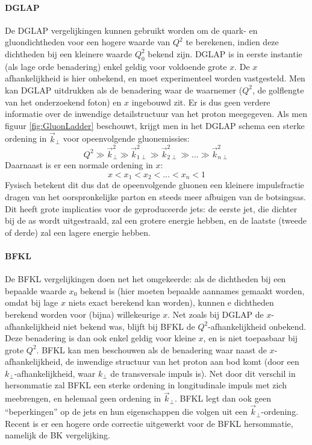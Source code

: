 \documentclass[a4paper,11pt]{article}
\numberwithin{equation}{section} %
\begin{document}
      \paragraph{DGLAP} \label{sec:DGLAP}
De DGLAP vergelijkingen kunnen gebruikt worden om de quark- en gluondichtheden voor een hogere waarde van $Q^2$ te berekenen, indien deze dichtheden bij een kleinere waarde $Q_0^2$ bekend zijn.
DGLAP is in eerste instantie (als lage orde benadering) enkel geldig voor voldoende grote $x$.
De $x$ afhankelijkheid is hier onbekend, en moet experimenteel worden vastgesteld.
Men kan DGLAP uitdrukken als de benadering waar de waarnemer ($Q^2$, de golflengte van het onderzoekend foton) en $x$ ingebouwd zit.
Er is dus geen verdere informatie over de inwendige detailstructuur van het proton meegegeven.
Als men figuur \ref{fig:GluonLadder} beschouwt, krijgt men in het DGLAP schema een sterke ordening in $\vec{k}_\perp$ voor opeenvolgende gluonemissies:
\begin{equation}
Q^2 \gg \vec{k}_\perp^2 \gg \vec{k}_{1\perp}^2 \gg \vec{k}_{2\perp}^2 \gg \hdots \gg \vec{k}_{n\perp}^2
\end{equation}
Daarnaast is er een normale ordening in $x$:
\begin{equation}
x < x_1 < x_2 < \hdots < x_n < 1
\end{equation}
Fysisch betekent dit dus dat de opeenvolgende gluonen een kleinere impulsfractie dragen van het oorspronkelijke parton en steeds meer afbuigen van de botsingsas.
Dit heeft grote implicaties voor de geproduceerde jets: de eerste jet, die dichter bij de as wordt uitgestraald, zal een grotere energie hebben, en de laatste (tweede of derde) zal een lagere energie hebben.

      \paragraph{BFKL}
De BFKL vergelijkingen doen net het omgekeerde: als de dichtheden bij een bepaalde waarde $x_0$ bekend is (hier moeten bepaalde aannames gemaakt worden, omdat bij lage $x$ niets exact berekend kan worden), kunnen e dichtheden berekend worden voor (bijna) willekeurige $x$.
Net zoals bij DGLAP de $x$-afhankelijkheid niet bekend was, blijft bij BFKL de $Q^2$-afhankelijkheid onbekend.
Deze benadering is dan ook enkel geldig voor kleine $x$, en is niet toepasbaar bij grote $Q^2$.
BFKL kan men beschouwen als de benadering waar naast de $x$-afhankelijkheid, de inwendige structuur van het proton aan bod komt (door een $k_\perp$-afhankelijkheid, waar $k_\perp$ de transversale impuls is).
Net door dit verschil in hersommatie zal BFKL een sterke ordening in longitudinale impuls met zich meebrengen, en helemaal geen ordening in $\vec{k}_\perp$.
BFKL legt dan ook geen “beperkingen” op de jets en hun eigenschappen die volgen uit een $\vec{k}_\perp$-ordening.
Recent is er een hogere orde correctie uitgewerkt voor de BFKL hersommatie, namelijk de BK vergelijking.
\end{document}
